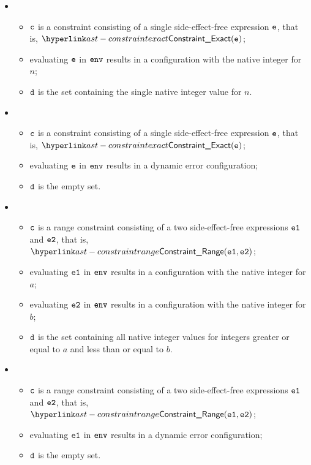 \begin{itemize}
  \item {}
  \begin{itemize}
    \item $\texttt{c}$ is a constraint consisting of a single side-effect-free expression $\texttt{e}$, that is, $\ConstraintExact(\ve)$;
    \item evaluating $\texttt{e}$ in $\texttt{env}$ results in a configuration with the native integer for $n$;
    \item $\texttt{d}$ is the set containing the single native integer value for $n$.
  \end{itemize}

  \item {}
  \begin{itemize}
    \item $\texttt{c}$ is a constraint consisting of a single side-effect-free expression $\texttt{e}$, that is, $\ConstraintExact(\ve)$;
    \item evaluating $\texttt{e}$ in $\texttt{env}$ results in a dynamic error configuration;
    \item $\texttt{d}$ is the empty set.
  \end{itemize}

  \item {}
  \begin{itemize}
    \item $\texttt{c}$ is a range constraint consisting of a two side-effect-free expressions $\texttt{e1}$ and $\texttt{e2}$, that is, $\ConstraintRange(\veone, \vetwo)$;
    \item evaluating $\texttt{e1}$ in $\texttt{env}$ results in a configuration with the native integer for $a$;
    \item evaluating $\texttt{e2}$ in $\texttt{env}$ results in a configuration with the native integer for $b$;
    \item $\texttt{d}$ is the set containing all native integer values for integers greater or equal to $a$ and less than or equal to $b$.
  \end{itemize}

  \item {}
  \begin{itemize}
    \item $\texttt{c}$ is a range constraint consisting of a two side-effect-free expressions $\texttt{e1}$ and $\texttt{e2}$, that is, $\ConstraintRange(\veone, \vetwo)$;
    \item evaluating $\texttt{e1}$ in $\texttt{env}$ results in a dynamic error configuration;
    \item $\texttt{d}$ is the empty set.
  \end{itemize}


\end{itemize}

